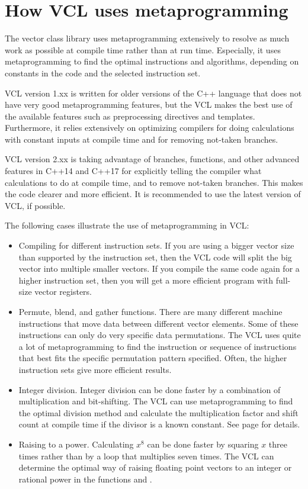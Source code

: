 \documentclass[vcl_manual.tex]{subfiles}
\begin{document}
\section{How VCL uses metaprogramming} \label{HowVCLUsesMetaprogramming}
The vector class library uses metaprogramming extensively to resolve as much work as possible at compile time rather than at run time. Especially, it uses metaprogramming to find the optimal instructions and algorithms, depending on constants in the code and the selected instruction set.

VCL version 1.xx is written for older versions of the C++ language that does not have very good metaprogramming features, but the VCL makes the best use of the available features such as preprocessing directives and templates. Furthermore, it relies extensively on optimizing compilers for  doing calculations with constant inputs at compile time and for removing not-taken branches.

VCL version 2.xx is taking advantage of  branches,  functions, and other advanced features in 
C++14 and C++17 for explicitly telling the compiler what calculations to do at compile time, and to remove not-taken branches. This makes the code clearer and more efficient. It is recommended to use the latest version of VCL, if possible.

The following cases illustrate the use of metaprogramming in VCL:
\begin{itemize}
\item Compiling for different instruction sets. If you are using a bigger vector size than supported by the instruction set, then the VCL code will split the big vector into multiple smaller vectors. If you compile the same code again for a higher instruction set, then you will get a more efficient program with full-size vector registers.

\item Permute, blend, and gather functions. There are many different machine instructions that move data between different vector elements. Some of these instructions can only do very specific data permutations. The VCL uses quite a lot of metaprogramming to find the instruction or sequence of instructions that best fits the specific permutation pattern specified. Often, the higher instruction sets give more efficient results.

\item Integer division. Integer division can be done faster by a combination of multiplication and bit-shifting. The VCL can use metaprogramming to find the optimal division method and calculate the multiplication factor and shift count at compile time if the divisor is a known constant. 
See page \pageref{HowVCLUsesMetaprogramming} for details.

\item Raising to a power. Calculating $x^8$ can be done faster by squaring $x$ three times rather than by a loop that multiplies seven times. The VCL can determine the optimal way of raising floating point vectors to an integer or rational power in the functions  and .
\end{itemize}
\end{document}
